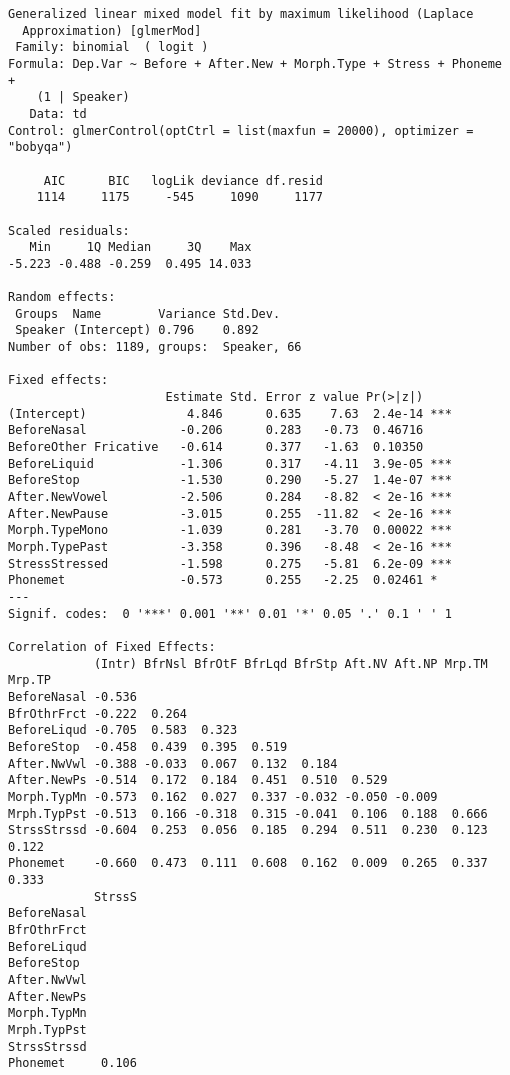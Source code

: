 \documentclass[
  10pt,
  letterpaper]{article}
\begin{document}
\begin{verbatim}
Generalized linear mixed model fit by maximum likelihood (Laplace
  Approximation) [glmerMod]
 Family: binomial  ( logit )
Formula: Dep.Var ~ Before + After.New + Morph.Type + Stress + Phoneme +  
    (1 | Speaker)
   Data: td
Control: glmerControl(optCtrl = list(maxfun = 20000), optimizer = "bobyqa")

     AIC      BIC   logLik deviance df.resid 
    1114     1175     -545     1090     1177 

Scaled residuals: 
   Min     1Q Median     3Q    Max 
-5.223 -0.488 -0.259  0.495 14.033 

Random effects:
 Groups  Name        Variance Std.Dev.
 Speaker (Intercept) 0.796    0.892   
Number of obs: 1189, groups:  Speaker, 66

Fixed effects:
                      Estimate Std. Error z value Pr(>|z|)    
(Intercept)              4.846      0.635    7.63  2.4e-14 ***
BeforeNasal             -0.206      0.283   -0.73  0.46716    
BeforeOther Fricative   -0.614      0.377   -1.63  0.10350    
BeforeLiquid            -1.306      0.317   -4.11  3.9e-05 ***
BeforeStop              -1.530      0.290   -5.27  1.4e-07 ***
After.NewVowel          -2.506      0.284   -8.82  < 2e-16 ***
After.NewPause          -3.015      0.255  -11.82  < 2e-16 ***
Morph.TypeMono          -1.039      0.281   -3.70  0.00022 ***
Morph.TypePast          -3.358      0.396   -8.48  < 2e-16 ***
StressStressed          -1.598      0.275   -5.81  6.2e-09 ***
Phonemet                -0.573      0.255   -2.25  0.02461 *  
---
Signif. codes:  0 '***' 0.001 '**' 0.01 '*' 0.05 '.' 0.1 ' ' 1

Correlation of Fixed Effects:
            (Intr) BfrNsl BfrOtF BfrLqd BfrStp Aft.NV Aft.NP Mrp.TM Mrp.TP
BeforeNasal -0.536                                                        
BfrOthrFrct -0.222  0.264                                                 
BeforeLiqud -0.705  0.583  0.323                                          
BeforeStop  -0.458  0.439  0.395  0.519                                   
After.NwVwl -0.388 -0.033  0.067  0.132  0.184                            
After.NewPs -0.514  0.172  0.184  0.451  0.510  0.529                     
Morph.TypMn -0.573  0.162  0.027  0.337 -0.032 -0.050 -0.009              
Mrph.TypPst -0.513  0.166 -0.318  0.315 -0.041  0.106  0.188  0.666       
StrssStrssd -0.604  0.253  0.056  0.185  0.294  0.511  0.230  0.123  0.122
Phonemet    -0.660  0.473  0.111  0.608  0.162  0.009  0.265  0.337  0.333
            StrssS
BeforeNasal       
BfrOthrFrct       
BeforeLiqud       
BeforeStop        
After.NwVwl       
After.NewPs       
Morph.TypMn       
Mrph.TypPst       
StrssStrssd       
Phonemet     0.106
\end{verbatim}
\end{document}
